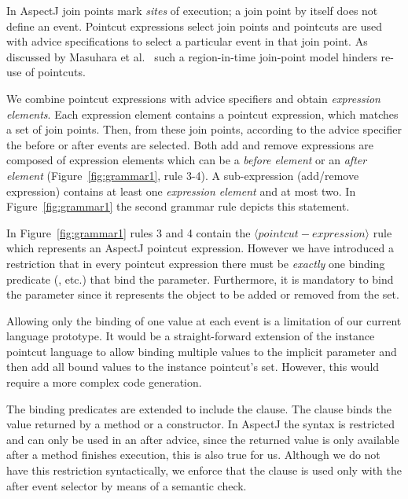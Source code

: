 In AspectJ join points mark \emph{sites} of execution; a join point by itself does not define an event.
Pointcut expressions select join points and pointcuts are used with advice specifications to select a particular event in that join point.
As discussed by Masuhara et al.~\cite{masuharafine} such a region-in-time join-point model hinders re-use of pointcuts.

We combine pointcut expressions with advice specifiers and obtain \emph{expression elements}.
Each expression element contains a pointcut expression, which matches a set of join points.
Then, from these join points, according to the advice specifier the before or after events are selected.
Both add and remove expressions are composed of expression elements which can be a \emph{before element} or an \emph{after element} (Figure~\ref{fig:grammar1}, rule 3-4).
A sub-expression (add/remove expression) contains at least one \emph{expression element} and at most two. In Figure~\ref{fig:grammar1} the second grammar rule depicts this statement.

In Figure~\ref{fig:grammar1} rules 3 and 4 contain the $\langle pointcut-expression\rangle$ rule which represents an AspectJ pointcut expression.
However we have introduced a restriction that in every pointcut expression there must be \emph{exactly} one binding predicate (,  etc.) that bind the  parameter.
Furthermore, it is mandatory to bind the  parameter since it represents the object to be added or removed from the set.

Allowing only the binding of one value at each event is a limitation of our current language prototype.
It would be a straight-forward extension of the instance pointcut language to allow binding multiple values to the implicit  parameter and then add all bound values to the instance pointcut's set.
However, this would require a more complex code generation.

The binding predicates are extended to include the  clause.
The  clause binds the value returned by a method or a constructor.
In AspectJ the syntax is restricted and  can only be used in an after advice, since the returned value is only available after a method finishes execution, this is also true for us.
Although we do not have this restriction syntactically, we enforce that the  clause is used only with the after event selector by means of a semantic check.

